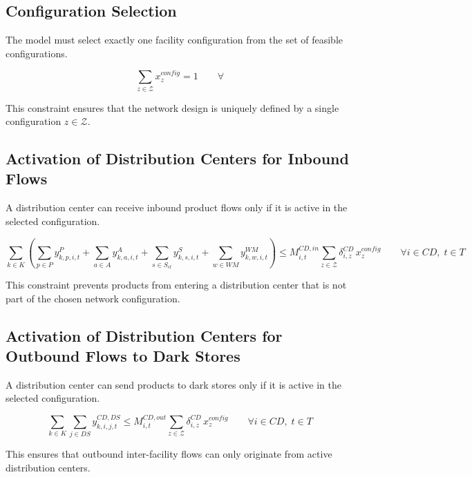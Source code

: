 \documentclass[12pt]{article}
\begin{document}
\subsection{Configuration Selection}

The model must select exactly one facility configuration from the set of feasible configurations.

\[
\sum_{z \in \mathcal{Z}} x^{config}_z = 1
\qquad \forall
\]

This constraint ensures that the network design is uniquely defined by a single configuration \(z \in \mathcal{Z}\).

\vspace{0.4cm}

\subsection{Activation of Distribution Centers for Inbound Flows}

A distribution center can receive inbound product flows only if it is active in the selected configuration.

\[
\sum_{k \in K}
\left(
\sum_{p \in P} y^{P}_{k,p,i,t}
+
\sum_{a \in A} y^{A}_{k,a,i,t}
+
\sum_{s \in S_{cl}} y^{S}_{k,s,i,t}
+
\sum_{w \in WM} y^{WM}_{k,w,i,t}
\right)
\le
M^{CD,in}_{i,t}
\sum_{z \in \mathcal{Z}} \delta^{CD}_{i,z}\,x^{config}_z
\qquad \forall i \in CD,\; t \in T
\]

This constraint prevents products from entering a distribution center that is not part of the chosen network configuration.

\vspace{0.4cm}

\subsection{Activation of Distribution Centers for Outbound Flows to Dark Stores}

A distribution center can send products to dark stores only if it is active in the selected configuration.

\[
\sum_{k \in K}\sum_{j \in DS} y^{CD,DS}_{k,i,j,t}
\le
M^{CD,out}_{i,t}
\sum_{z \in \mathcal{Z}} \delta^{CD}_{i,z}\,x^{config}_z
\qquad \forall i \in CD,\; t \in T
\]

This ensures that outbound inter-facility flows can only originate from active distribution centers.

\vspace{0.4cm}
\end{document}
